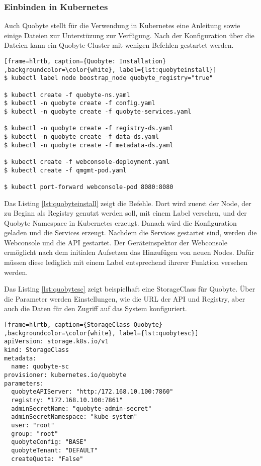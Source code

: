 \subsubsection{Einbinden in Kubernetes}
Auch Quobyte stellt für die Verwendung in Kubernetes eine Anleitung sowie einige Dateien zur Unterstüzung zur Verfügung. Nach der Konfiguration über die Dateien kann ein Quobyte-Cluster mit wenigen Befehlen gestartet werden.

\lstset{language=bash}
\begin{lstlisting}[frame=hlrtb, caption={Quobyte: Installation} ,backgroundcolor=\color{white}, label={lst:quobyteinstall}]
$ kubectl label node boostrap_node quobyte_registry="true"

$ kubectl create -f quobyte-ns.yaml
$ kubectl -n quobyte create -f config.yaml
$ kubectl -n quobyte create -f quobyte-services.yaml

$ kubectl -n quobyte create -f registry-ds.yaml
$ kubectl -n quobyte create -f data-ds.yaml
$ kubectl -n quobyte create -f metadata-ds.yaml

$ kubectl create -f webconsole-deployment.yaml
$ kubectl create -f qmgmt-pod.yaml

$ kubectl port-forward webconsole-pod 8080:8080
\end{lstlisting}
Das Listing \ref{lst:quobyteinstall} zeigt die Befehle. Dort wird zuerst der Node, der zu Beginn als Registry genutzt werden soll, mit einem Label versehen, und der Quobyte Namespace in Kubernetes erzeugt. Danach wird die Konfiguration geladen und die Services erzeugt. Nachdem die Services gestartet sind, werden die Webconsole und die API gestartet. Der Geräteinspektor der Webconsole ermöglicht nach dem initialen Aufsetzen das Hinzufügen von neuen Nodes. Dafür müssen diese lediglich mit einem Label entsprechend ihrerer Funktion versehen werden. \medskip

Das Listing \ref{lst:quobytesc} zeigt beispielhaft eine StorageClass für Quobyte. Über die Parameter werden Einstellungen, wie die URL der API und Registry, aber auch die Daten für den Zugriff auf das System konfiguriert. \medskip

\lstset{language=yaml}
\begin{lstlisting}[frame=hlrtb, caption={StorageClass Quobyte} ,backgroundcolor=\color{white}, label={lst:quobytesc}]
apiVersion: storage.k8s.io/v1
kind: StorageClass
metadata:
  name: quobyte-sc
provisioner: kubernetes.io/quobyte
parameters:
  quobyteAPIServer: "http:/172.168.10.100:7860"
  registry: "172.168.10.100:7861"
  adminSecretName: "quobyte-admin-secret"
  adminSecretNamespace: "kube-system"
  user: "root"
  group: "root"
  quobyteConfig: "BASE"
  quobyteTenant: "DEFAULT"
  createQuota: "False"
\end{lstlisting}

